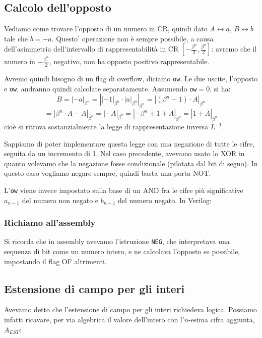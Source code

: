 \documentclass[a4paper,11pt]{article}
\begin{document}
\subsection{Calcolo dell'opposto}
Vediamo come trovare l'opposto di un numero in CR, quindi dato $A \leftrightarrow a$, $B \leftrightarrow b$ tale che $ b = -a$.
Questo' operazione non è sempre possibile, a causa dell'asimmetria dell'intervallo di rappresentabilità in CR $\left[-\frac{\beta^n}{2}, \frac{\beta^n}{2}\right]$: avremo che il numero in $-\frac{\beta^n}{2}$, negativo, non ha opposto positivo rappresentabile.

Avremo quindi bisogno di un flag di overflow, diciamo \lstinline|ow|.
Le due uscite, l'opposto e \lstinline|ow|, andranno quindi calcolate separatamente.
Assumendo \lstinline|ow|$=0$, si ha:
$$
B = |-a|_{\beta^n} = \left||-1|_{\beta^n} \cdot |a|_{\beta^n} \right|_{\beta^n} = |(\beta^n - 1) \cdot A|_{\beta^n}
$$
$$
= |\beta^n \cdot A - A |_{\beta^n} = |-A|_{\beta^n} = |-\beta^n + 1 + \overline{A}|_{\beta^n} = |1 + \overline{A}|_{\beta^n}
$$
cioè si ritrova sostanzialmente la legge di rappresentazione inversa $L^{-1}$.

Sappiamo di poter implementare questa legge con una negazione di tutte le cifre, seguita da un incremento di 1.
Nel caso precedente, avevamo usato lo XOR in quanto volevamo che la negazione fosse condizionale (pilotata dal bit di segno).
In questo caso vogliamo negare sempre, quindi basta una porta NOT.

L'\lstinline|ow| viene invece impostato sulla base di un AND fra le cifre più significative $a_{n-1}$ del numero non negato e $b_{n-1}$ del numero negato.
In Verilog:



\subsubsection{Richiamo all'assembly}
Si ricorda che in assembly avevamo l'istruzione \lstinline|NEG|, che interpretava una sequenza di bit come un numero intero, e ne calcolava l'opposto se possibile, impostando il flag OF altrimenti.

\subsection{Estensione di campo per gli interi}
Avevamo detto che l'estensione di campo per gli interi richiedeva logica.
Possiamo infatti ricavare, per via algebrica il valore dell'intero con l'$n$-esima cifra aggiunta, $A_{EST}$:
\end{document}
